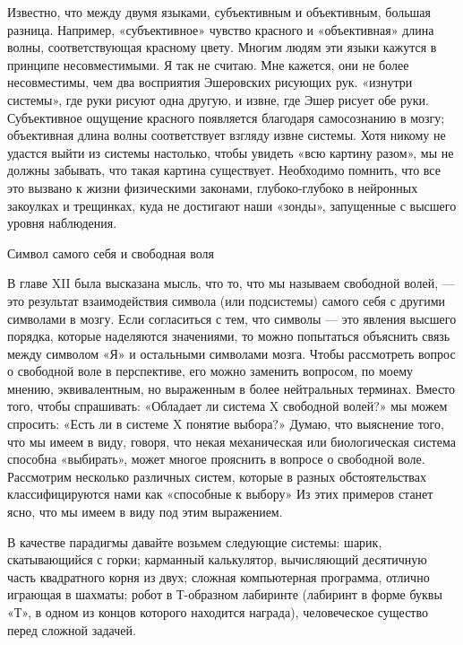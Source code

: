 Известно, что между двумя языками, субъективным и объективным, большая разница. Например, «субъективное» чувство красного и «объективная» длина волны, соответствующая красному цвету. Многим людям эти языки кажутся в принципе несовместимыми. Я так не считаю. Мне кажется, они не более несовместимы, чем два восприятия Эшеровских рисующих рук. «изнутри системы», где руки рисуют одна другую, и извне, где Эшер рисует обе руки. Субъективное ощущение красного появляется благодаря самосознанию в мозгу; объективная длина волны соответствует взгляду извне системы. Хотя никому не удастся выйти из системы настолько, чтобы увидеть «всю картину разом», мы не должны забывать, что такая картина существует. Необходимо помнить, что все это вызвано к жизни физическими законами, глубоко-глубоко в нейронных закоулках и трещинках, куда не достигают наши «зонды», запущенные с высшего уровня наблюдения.

Символ самого себя и свободная воля

В главе XII была высказана мысль, что то, что мы называем свободной волей, --- это результат взаимодействия символа (или подсистемы) самого себя с другими символами в мозгу. Если согласиться с тем, что символы --- это явления высшего порядка, которые наделяются значениями, то можно попытаться объяснить связь между символом «Я» и остальными символами мозга. Чтобы рассмотреть вопрос о свободной воле в перспективе, его можно заменить вопросом, по моему мнению, эквивалентным, но выраженным в более нейтральных терминах. Вместо того, чтобы спрашивать: «Обладает ли система X свободной волей?» мы можем спросить: «Есть ли в системе X понятие выбора?» Думаю, что выяснение того, что мы имеем в виду, говоря, что некая механическая или биологическая система способна «выбирать», может многое прояснить в вопросе о свободной воле. Рассмотрим несколько различных систем, которые в разных обстоятельствах классифицируются нами как «способные к выбору» Из этих примеров станет ясно, что мы имеем в виду под этим выражением.

В качестве парадигмы давайте возьмем следующие системы: шарик, скатывающийся с горки; карманный калькулятор, вычисляющий десятичную часть квадратного корня из двух; сложная компьютерная программа, отлично играющая в шахматы; робот в Т-образном лабиринте (лабиринт в форме буквы «Т», в одном из концов которого находится награда), человеческое существо перед сложной задачей.

